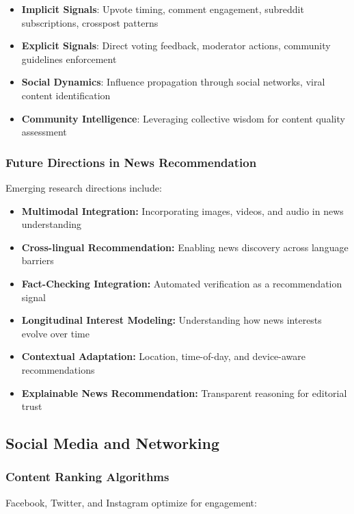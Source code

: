 \begin{itemize}
    \item \textbf{Implicit Signals}: Upvote timing, comment engagement, subreddit subscriptions, crosspost patterns
    \item \textbf{Explicit Signals}: Direct voting feedback, moderator actions, community guidelines enforcement
    \item \textbf{Social Dynamics}: Influence propagation through social networks, viral content identification
    \item \textbf{Community Intelligence}: Leveraging collective wisdom for content quality assessment
\end{itemize}

\subsubsection{Future Directions in News Recommendation}

Emerging research directions include:

\begin{itemize}
    \item \textbf{Multimodal Integration:} Incorporating images, videos, and audio in news understanding
    \item \textbf{Cross-lingual Recommendation:} Enabling news discovery across language barriers
    \item \textbf{Fact-Checking Integration:} Automated verification as a recommendation signal
    \item \textbf{Longitudinal Interest Modeling:} Understanding how news interests evolve over time
    \item \textbf{Contextual Adaptation:} Location, time-of-day, and device-aware recommendations
    \item \textbf{Explainable News Recommendation:} Transparent reasoning for editorial trust
\end{itemize}

\subsection{Social Media and Networking}

\subsubsection{Content Ranking Algorithms}

Facebook, Twitter, and Instagram optimize for engagement:

